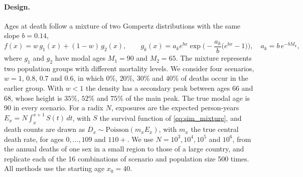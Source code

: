 \documentclass[12pt, letterpaper]{article}
\begin{document}
\paragraph{Design.} Ages at death follow a mixture of two Gompertz distributions with the same slope $b = 0.14$,
\begin{equation}
f(x) = w\, g_1(x) + (1 - w)\, g_2(x), \qquad
g_k(x) = a_k e^{b x} \exp\!\Big(-\frac{a_k}{b}\big(e^{b x} - 1\big)\Big), \quad a_k = b\, e^{-b M_k},
\label{eq:sim_mixture}
\end{equation}
where $g_1$ and $g_2$ have modal ages $M_1 = 90$ and $M_2 = 65$. The mixture represents two population groups with different mortality levels. We consider four scenarios, $w = 1$, $0.8$, $0.7$ and $0.6$, in which $0\%$, $20\%$, $30\%$ and $40\%$ of deaths occur in the earlier group. With $w < 1$ the density has a secondary peak between ages 66 and 68, whose height is $35\%$, $52\%$ and $75\%$ of the main peak. The true modal age is 90 in every scenario. For a radix $N$, exposures are the expected person-years $E_x = N \int_x^{x+1} S(t)\, dt$, with $S$ the survival function of \eqref{eq:sim_mixture}, and death counts are drawn as $D_x \sim \text{Poisson}(m_x E_x)$, with $m_x$ the true central death rate, for ages $0, \dots, 109$ and $110+$. We use $N = 10^3, 10^4, 10^5$ and $10^6$, from the annual deaths of one sex in a small region to those of a large country, and replicate each of the 16 combinations of scenario and population size 500 times. All methods use the starting age $x_0 = 40$.
\end{document}

